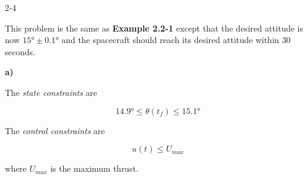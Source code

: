 \begin{problem}{2-4}
\end{problem}

This problem is the same as \textbf{Example 2.2-1} except that the desired 
attitude is now $\ang{15} \pm \ang{0.1}$ and the spacecraft should reach its 
desired attitude within $30$ seconds.

\noindent \textbf{a)}

The \textit{state constraints} are

\begin{equation}\label{eq:sc_att_15}
    \ang{14.9} \leq \theta(t_f) \leq \ang{15.1}
\end{equation}

The \textit{control constraints} are

\begin{equation}\label{eq:sc_att_15}
    u(t) \leq U_{max}
\end{equation}

\noindent where $U_{max}$ is the maximum thrust.


